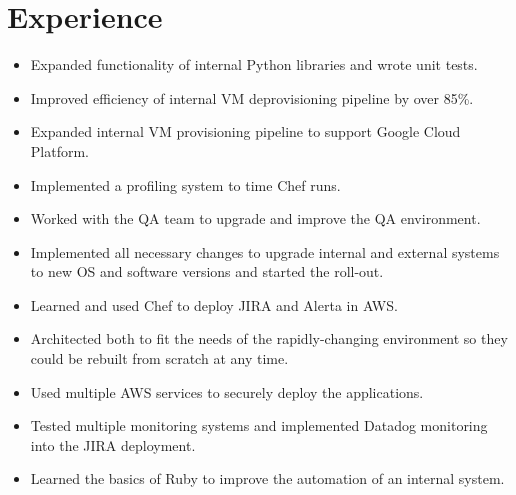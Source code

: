 \documentclass[]{deedy-resume-openfont}
\begin{document}
\begin{minipage}[t]{0.66\textwidth} 


\section{Experience}
\vspace{-1mm}
\begin{itemize}
  \itemsep-4pt
  \item Expanded functionality of internal Python libraries and wrote unit tests.
  \item Improved efficiency of internal VM deprovisioning pipeline by over 85\%.
  \item Expanded internal VM provisioning pipeline to support Google Cloud Platform.
  \item Implemented a profiling system to time Chef runs.
  \item Worked with the QA team to upgrade and improve the QA environment.
  \item Implemented all necessary changes to upgrade internal and external systems to new OS and software versions and started the roll-out.
\end{itemize}
\vspace{-4.5mm}
\sectionsep

\vspace{-3mm}
\begin{itemize}
  \itemsep-4pt
  \item Learned and used Chef to deploy JIRA and Alerta in AWS.
  \item Architected both to fit the needs of the rapidly-changing environment so they could be rebuilt from scratch at any time.
  \item Used multiple AWS services to securely deploy the applications.
  \item Tested multiple monitoring systems and implemented Datadog monitoring into the JIRA deployment.
  \item Learned the basics of Ruby to improve the automation of an internal system.
\end{itemize}
\vspace{-4.5mm}
\sectionsep


\end{minipage}
\end{document}
